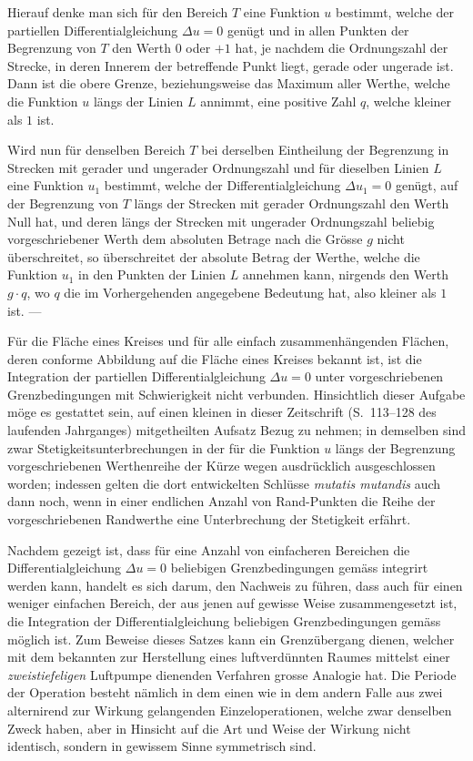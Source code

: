 \documentclass{article}
\begin{document}
Hierauf denke man sich für den Bereich $T$ eine Funktion $u$ bestimmt, welche der partiellen Differentialgleichung $\Delta u = 0$ genügt und in allen Punkten der Begrenzung von $T$ den Werth $0$ oder $+1$ hat, je nachdem die Ordnungszahl der Strecke, in deren Innerem der betreffende Punkt liegt, gerade oder ungerade ist. Dann ist die obere Grenze, beziehungsweise das Maximum aller Werthe, welche die Funktion $u$ längs der Linien $L$ annimmt, eine positive Zahl $q$, welche kleiner als $1$ ist.

Wird nun für denselben Bereich $T$ bei derselben Eintheilung der Begrenzung in Strecken mit gerader und ungerader Ordnungszahl und für dieselben Linien $L$ eine Funktion $u_1$ bestimmt, welche der Differentialgleichung $\Delta u_1 = 0$ genügt, auf der Begrenzung von $T$ längs der Strecken mit gerader Ordnungszahl den Werth Null hat, und deren längs der Strecken mit ungerader Ordnungszahl beliebig vorgeschriebener Werth dem absoluten Betrage nach die Grösse $g$ nicht überschreitet, so überschreitet der absolute Betrag der Werthe, welche die Funktion $u_1$ in den Punkten der Linien $L$ annehmen kann, nirgends den Werth $g \cdot q$, wo $q$ die im Vorhergehenden angegebene Bedeutung hat, also kleiner als $1$ ist. ---


Für die Fläche eines Kreises und für alle einfach zusammenhängenden Flächen, deren conforme Abbildung auf die Fläche eines Kreises bekannt ist, ist die Integration der partiellen Differentialgleichung $\Delta u = 0$ unter vorgeschriebenen Grenzbedingungen mit Schwierigkeit nicht verbunden. Hinsichtlich dieser Aufgabe möge es gestattet sein, auf einen kleinen in dieser Zeitschrift (S.~113--128 des laufenden Jahrganges) mitgetheilten Aufsatz Bezug zu nehmen; in demselben sind zwar Stetigkeitsunterbrechungen in der für die Funktion $u$ längs der Begrenzung vorgeschriebenen Werthenreihe der Kürze wegen ausdrücklich ausgeschlossen worden; indessen gelten die dort entwickelten Schlüsse \emph{mutatis mutandis} auch dann noch, wenn in einer endlichen Anzahl von Rand-Punkten die Reihe der vorgeschriebenen Randwerthe eine Unterbrechung der Stetigkeit erfährt.

Nachdem gezeigt ist, dass für eine Anzahl von einfacheren Bereichen die Differentialgleichung $\Delta u = 0$ beliebigen Grenzbedingungen gemäss integrirt werden kann, handelt es sich darum, den Nachweis zu führen, dass auch für einen weniger einfachen Bereich, der aus jenen auf gewisse Weise zusammengesetzt ist, die Integration der Differentialgleichung beliebigen Grenzbedingungen gemäss möglich ist. Zum Beweise dieses Satzes kann ein Grenzübergang dienen, welcher mit dem bekannten zur Herstellung eines luftverdünnten Raumes mittelst einer \emph{zweistiefeligen} Luftpumpe dienenden Verfahren grosse Analogie hat. Die Periode der Operation besteht nämlich in dem einen wie in dem andern Falle aus zwei alternirend zur Wirkung gelangenden Einzeloperationen, welche
zwar denselben Zweck haben, aber in Hinsicht auf die Art und Weise der Wirkung nicht identisch, sondern in gewissem Sinne symmetrisch sind.
\end{document}
